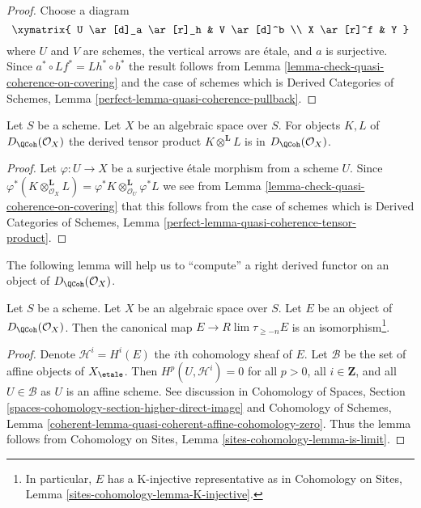 \begin{proof}
Choose a diagram
$$
\xymatrix{
U \ar[d]_a \ar[r]_h & V \ar[d]^b \\
X \ar[r]^f & Y
}
$$
where $U$ and $V$ are schemes, the vertical arrows are \'etale, and
$a$ is surjective. Since $a^* \circ Lf^* = Lh^* \circ b^*$ the result
follows from
Lemma \ref{lemma-check-quasi-coherence-on-covering}
and the case of schemes which is
Derived Categories of Schemes, Lemma
\ref{perfect-lemma-quasi-coherence-pullback}.
\end{proof}

\begin{lemma}
\label{lemma-quasi-coherence-tensor-product}
Let $S$ be a scheme. Let $X$ be an algebraic space over $S$.
For objects $K, L$ of $D_\QCoh(\mathcal{O}_X)$
the derived tensor product $K \otimes^\mathbf{L} L$ is in
$D_\QCoh(\mathcal{O}_X)$.
\end{lemma}

\begin{proof}
Let $\varphi : U \to X$ be a surjective \'etale morphism from a scheme $U$.
Since
$\varphi^*(K \otimes_{\mathcal{O}_X}^\mathbf{L} L) =
\varphi^*K \otimes_{\mathcal{O}_U}^\mathbf{L} \varphi^*L$
we see from
Lemma \ref{lemma-check-quasi-coherence-on-covering}
that this follows from the case of schemes which is
Derived Categories of Schemes, Lemma
\ref{perfect-lemma-quasi-coherence-tensor-product}.
\end{proof}

\noindent
The following lemma will help us to ``compute'' a right derived functor
on an object of $D_\QCoh(\mathcal{O}_X)$.

\begin{lemma}
\label{lemma-nice-K-injective}
Let $S$ be a scheme. Let $X$ be an algebraic space over $S$. Let $E$ be an
object of $D_\QCoh(\mathcal{O}_X)$. Then the canonical map
$E \to R\lim \tau_{\geq -n}E$ is an isomorphism\footnote{In particular,
$E$ has a K-injective representative as in
Cohomology on Sites, Lemma \ref{sites-cohomology-lemma-K-injective}.}.
\end{lemma}

\begin{proof}
Denote $\mathcal{H}^i = H^i(E)$ the $i$th cohomology sheaf of $E$.
Let $\mathcal{B}$ be the set of affine objects of $X_\etale$.
Then $H^p(U, \mathcal{H}^i) = 0$ for all $p > 0$, all $i \in \mathbf{Z}$,
and all $U \in \mathcal{B}$ as $U$ is an affine scheme.
See discussion in
Cohomology of Spaces, Section
\ref{spaces-cohomology-section-higher-direct-image}
and
Cohomology of Schemes, Lemma
\ref{coherent-lemma-quasi-coherent-affine-cohomology-zero}.
Thus the lemma follows from
Cohomology on Sites, Lemma \ref{sites-cohomology-lemma-is-limit}.
\end{proof}

